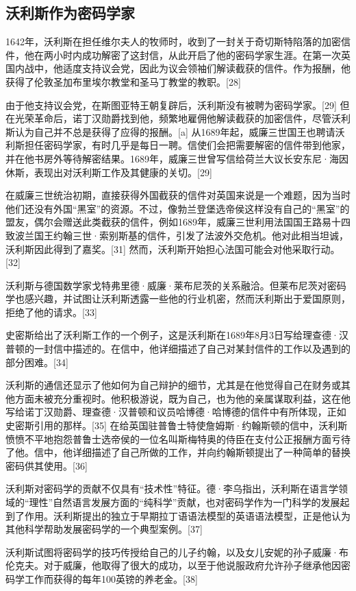 \subsection{沃利斯作为密码学家}
1642年，沃利斯在担任维尔夫人的牧师时，收到了一封关于奇切斯特陷落的加密信件，他在两小时内成功解密了这封信，从此开启了他的密码学家生涯。在第一次英国内战中，他适度支持议会党，因此为议会领袖们解读截获的信件。作为报酬，他获得了伦敦圣加布里埃尔教堂和圣马丁教堂的教职。[28]

由于他支持议会党，在斯图亚特王朝复辟后，沃利斯没有被聘为密码学家。[29] 但在光荣革命后，诺丁汉勋爵找到他，频繁地雇佣他解读截获的加密信件，尽管沃利斯认为自己并不总是获得了应得的报酬。[a] 从1689年起，威廉三世国王也聘请沃利斯担任密码学家，有时几乎是每日一聘。信使们会把需要解密的信件带到他家，并在他书房外等待解密结果。1689年，威廉三世曾写信给荷兰大议长安东尼·海因休斯，表现出对沃利斯工作及其健康的关切。[29]

在威廉三世统治初期，直接获得外国截获的信件对英国来说是一个难题，因为当时他们还没有外国“黑室”的资源。不过，像勃兰登堡选帝侯这样没有自己的“黑室”的盟友，偶尔会赠送此类截获的信件，例如1689年，威廉三世利用法国国王路易十四致波兰国王约翰三世·索别斯基的信件，引发了法波外交危机。他对此相当坦诚，沃利斯因此得到了嘉奖。[31] 然而，沃利斯开始担心法国可能会对他采取行动。[32]

沃利斯与德国数学家戈特弗里德·威廉·莱布尼茨的关系融洽。但莱布尼茨对密码学也感兴趣，并试图让沃利斯透露一些他的行业机密，然而沃利斯出于爱国原则，拒绝了他的请求。[33]

史密斯给出了沃利斯工作的一个例子，这是沃利斯在1689年8月3日写给理查德·汉普顿的一封信中描述的。在信中，他详细描述了自己对某封信件的工作以及遇到的部分困难。[34]

沃利斯的通信还显示了他如何为自己辩护的细节，尤其是在他觉得自己在财务或其他方面未被充分重视时。他积极游说，既为自己，也为他的亲属谋取利益，这在他写给诺丁汉勋爵、理查德·汉普顿和议员哈博德·哈博德的信件中有所体现，正如史密斯引用的那样。[35] 在给英国驻普鲁士特使詹姆斯·约翰斯顿的信中，沃利斯愤愤不平地抱怨普鲁士选帝侯的一位名叫斯梅特奥的侍臣在支付公正报酬方面亏待了他。信中，他详细描述了自己所做的工作，并向约翰斯顿提出了一种简单的替换密码供其使用。[36]

沃利斯对密码学的贡献不仅具有“技术性”特征。德·李乌指出，沃利斯在语言学领域的“理性”自然语言发展方面的“纯科学”贡献，也对密码学作为一门科学的发展起到了作用。沃利斯提出的独立于早期拉丁语语法模型的英语语法模型，正是他认为其他科学帮助发展密码学的一个典型案例。[37]

沃利斯试图将密码学的技巧传授给自己的儿子约翰，以及女儿安妮的孙子威廉·布伦克夫。对于威廉，他取得了很大的成功，以至于他说服政府允许孙子继承他因密码学工作而获得的每年100英镑的养老金。[38]

